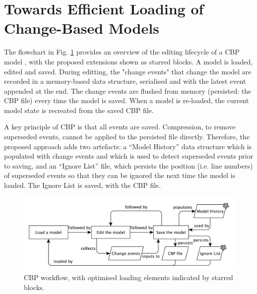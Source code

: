 \documentclass{llncs}
\begin{document}
    
    \section{Towards Efficient Loading of Change-Based Models}
    \label{sec:loading_time_optimisation}
    The flowchart in Fig. \ref{fig:flowchart} provides an overview of the editing lifecycle of a CBP model \cite{yohannis2017turning}, with the proposed extensions shown as starred blocks.  A model is loaded, edited and saved.  During editting, the "change events" that change the model are recorded in a memory-based data structure, serialised and with the latest event appended at the end.  The change events are flushed from memory (persisted: the CBP file) every time the model is saved.  When a model is re-loaded, the current model state is recreated from the saved CBP file.
    
    
    A key principle of CBP is that all events are saved.  Compression, to remove superseded events, cannot be applied to the persisted file directly.  Therefore, the proposed approach adds two artefacts: a ``Model History'' data structure which is populated with change events and which is used to detect superseded events prior to saving, and an ``Ignore List'' file, which persists the position (i.e. line numbers) of superseded events so that they can be ignored the next time the model is loaded.  The Ignore List is saved, with the CBP file.
    
    \begin{figure}[ht]
        \centering
        \includegraphics[width=\linewidth]{flowchart}
        \caption{CBP workflow, with optimised loading elements indicated by starred blocks.}
        \label{fig:flowchart}
    \end{figure}
    
\end{document}
